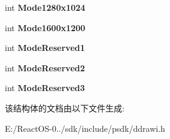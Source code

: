\begin{DoxyCompactItemize}
int {\bfseries Mode1280x1024}
\item 
\mbox{\label{struct___d_d_m_o_n_i_t_o_r_i_n_f_o_abfe5be70a0f64bc436501b0625494a35}} 
int {\bfseries Mode1600x1200}
\item 
\mbox{\label{struct___d_d_m_o_n_i_t_o_r_i_n_f_o_a237b6726c811a8d097bca58e5214cbeb}} 
int {\bfseries Mode\+Reserved1}
\item 
\mbox{\label{struct___d_d_m_o_n_i_t_o_r_i_n_f_o_a613d47ee6143de4d9db2bb7807bbafa8}} 
int {\bfseries Mode\+Reserved2}
\item 
\mbox{\label{struct___d_d_m_o_n_i_t_o_r_i_n_f_o_a8041c0afe9f77148a45d3fd8c5669c81}} 
int {\bfseries Mode\+Reserved3}
\end{DoxyCompactItemize}


该结构体的文档由以下文件生成\+:\begin{DoxyCompactItemize}
\item 
E\+:/\+React\+O\+S-\/0../sdk/include/psdk/ddrawi.\+h\end{DoxyCompactItemize}
